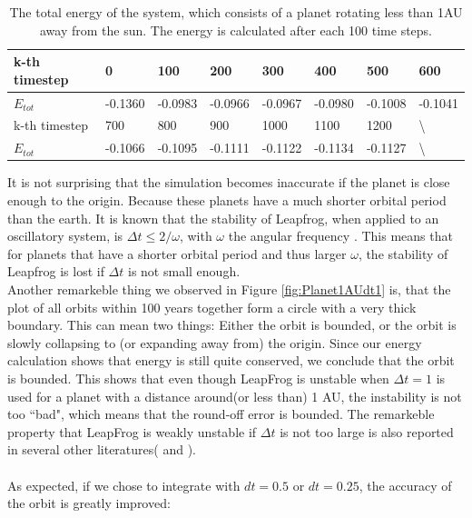 \begin{table}[htb]
\centering
\caption{The total energy of the system, which consists of a planet rotating less than 1AU away from the sun. The energy is calculated after each 100 time steps.}
\label{my-label}
\begin{tabular}{|l|l|l|l|l|l|l|l|}
\hline
k-th timestep &0 &100 & 200 & 300 & 400 & 500 & 600\\ \hline
$E_{tot}$     & -0.1360 & -0.0983 & -0.0966 & -0.0967 & -0.0980 & -0.1008 & -0.1041\\ \hline
k-th timestep & 700 & 800 & 900 & 1000 & 1100  & 1200& \:\:\:\:\:\:\textbackslash   \\ \hline
$E_{tot}$& -0.1066 & -0.1095 & -0.1111 & -0.1122 & -0.1134 & -0.1127&\:\:\:\:\:\:\textbackslash  \\ \hline
\end{tabular}
\label{tab:Planet1AUEnergy}
\end{table}

It is not surprising that the simulation becomes inaccurate if the planet is close enough to the origin.
Because these planets have a much shorter orbital period than the earth. It is known that the stability of Leapfrog, when applied to an oscillatory system, is $\Delta t\leq 2/\omega$, with $\omega$ the angular frequency \cite{StabLeapfrog}. This means that for planets that have a shorter orbital period and thus larger $\omega$, the stability of Leapfrog is lost if $\Delta t$ is not small enough.\\

Another remarkeble thing we observed in Figure \ref{fig:Planet1AUdt1} is, that the plot of all orbits within 100 years together form a circle with a very thick boundary. This can mean two things: Either the orbit is bounded, or the orbit is slowly collapsing to (or expanding away from) the origin. Since our energy calculation shows that energy is still quite conserved, we conclude that the orbit is bounded. This shows that even though LeapFrog is unstable when $\Delta t=1$ is used for a planet with a distance around(or less than) 1 AU, the instability is not too ``bad", which means that the round-off error is bounded. The remarkeble property that LeapFrog is weakly unstable if $\Delta t$ is not too large is also reported in several other literatures(\cite{Energy} and \cite{Leapfrogsympletic}).\\
\\ 
As expected, if we chose to integrate with $dt=0.5$ or $dt=0.25$, the accuracy of the orbit is greatly improved:

